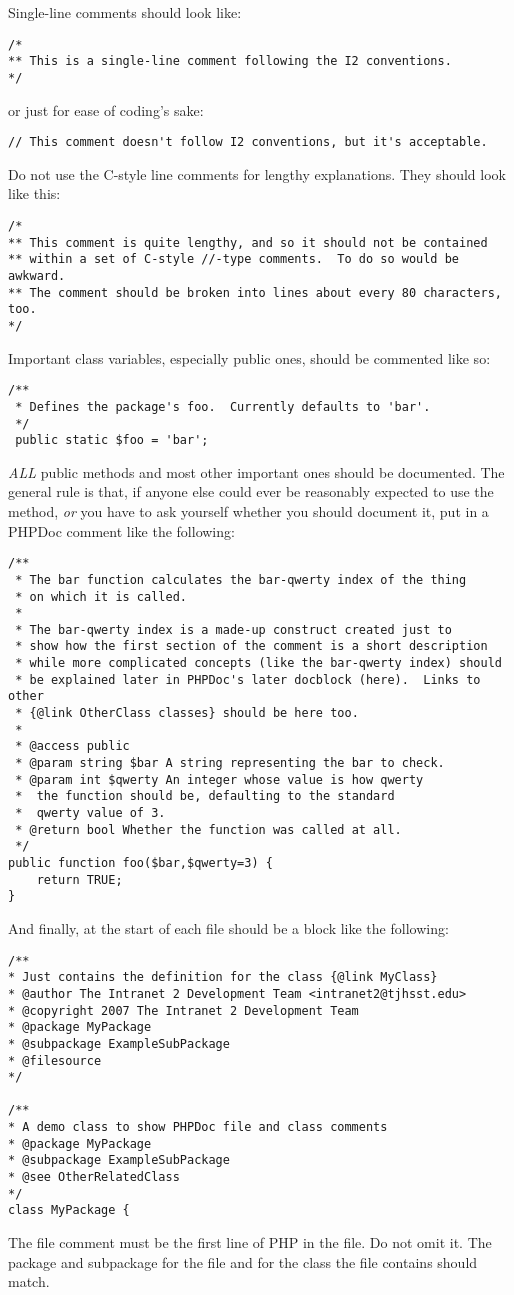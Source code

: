 \documentclass[11pt,letterpaper]{report}
\begin{document}
Single-line comments should look like:
\begin{lstlisting}
/*
** This is a single-line comment following the I2 conventions.
*/
\end{lstlisting}
or just for ease of coding's sake:
\begin{lstlisting}
// This comment doesn't follow I2 conventions, but it's acceptable.
\end{lstlisting}
Do not use the C-style line comments for lengthy explanations.  They should look like this:
\begin{lstlisting}
/*
** This comment is quite lengthy, and so it should not be contained
** within a set of C-style //-type comments.  To do so would be awkward.
** The comment should be broken into lines about every 80 characters, too.
*/
\end{lstlisting}
Important class variables, especially public ones, should be commented like so:
\begin{lstlisting}
/**
 * Defines the package's foo.  Currently defaults to 'bar'.
 */
 public static $foo = 'bar';
\end{lstlisting}
\emph{ALL} public methods and most other important ones should be documented.
The general rule is that, if anyone else could ever be reasonably expected to use the method, \emph{or} you
have to ask yourself whether you should document it, put in a PHPDoc comment like the following:
\begin{lstlisting}
/**
 * The bar function calculates the bar-qwerty index of the thing
 * on which it is called.
 *
 * The bar-qwerty index is a made-up construct created just to
 * show how the first section of the comment is a short description
 * while more complicated concepts (like the bar-qwerty index) should
 * be explained later in PHPDoc's later docblock (here).  Links to other
 * {@link OtherClass classes} should be here too.
 *
 * @access public
 * @param string $bar A string representing the bar to check.
 * @param int $qwerty An integer whose value is how qwerty
 *	the function should be, defaulting to the standard
 *	qwerty value of 3.
 * @return bool Whether the function was called at all.
 */
public function foo($bar,$qwerty=3) {
	return TRUE;
}
\end{lstlisting}
And finally, at the start of each file should be a block like the following:
\begin{lstlisting}
/**
* Just contains the definition for the class {@link MyClass}
* @author The Intranet 2 Development Team <intranet2@tjhsst.edu>
* @copyright 2007 The Intranet 2 Development Team
* @package MyPackage
* @subpackage ExampleSubPackage
* @filesource
*/

/**
* A demo class to show PHPDoc file and class comments
* @package MyPackage
* @subpackage ExampleSubPackage
* @see OtherRelatedClass
*/
class MyPackage {
\end{lstlisting}
The file comment must be the first line of PHP in the file.  Do not omit it.  The package and subpackage for the file
and for the class the file contains should match.
\end{document}
